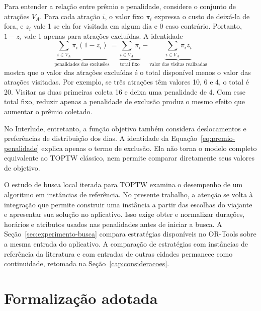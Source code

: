 Para entender a relação entre prêmio e penalidade, considere o conjunto de atrações $V_A$. Para cada atração $i$, o valor fixo $\pi_i$ expressa o custo de deixá-la de fora, e $z_i$ vale 1 se ela for visitada em algum dia e 0 caso contrário. Portanto, $1-z_i$ vale 1 apenas para atrações excluídas. A identidade
\begin{equation}
\underbrace{\sum_{i\in V_A}\pi_i(1-z_i)}_{\text{penalidades das exclusões}}
=\underbrace{\sum_{i\in V_A}\pi_i}_{\text{total fixo}}
-\underbrace{\sum_{i\in V_A}\pi_i z_i}_{\text{valor das visitas realizadas}}
\label{eq:premio-penalidade}
\end{equation}
mostra que o valor das atrações excluídas é o total disponível menos o valor das atrações visitadas. Por exemplo, se três atrações têm valores 10, 6 e 4, o total é 20. Visitar as duas primeiras coleta 16 e deixa uma penalidade de 4. Com esse total fixo, reduzir apenas a penalidade de exclusão produz o mesmo efeito que aumentar o prêmio coletado.

No Interlude, entretanto, a função objetivo também considera deslocamentos e preferências de distribuição dos dias. A identidade da Equação~\ref{eq:premio-penalidade} explica apenas o termo de exclusão. Ela não torna o modelo completo equivalente ao TOPTW clássico, nem permite comparar diretamente seus valores de objetivo.

O estudo de busca local iterada para TOPTW \cite{vansteenwegen2009ils} examina o desempenho de um algoritmo em instâncias de referência. No presente trabalho, a atenção se volta à integração que permite construir uma instância a partir das escolhas do viajante e apresentar sua solução no aplicativo. Isso exige obter e normalizar durações, horários e atributos usados nas penalidades antes de iniciar a busca. A Seção~\ref{sec:experimento-busca} compara estratégias disponíveis no OR-Tools sobre a mesma entrada do aplicativo. A comparação de estratégias com instâncias de referência da literatura e com entradas de outras cidades permanece como continuidade, retomada na Seção~\ref{cap:consideracoes}.



\section{Formalização adotada}

